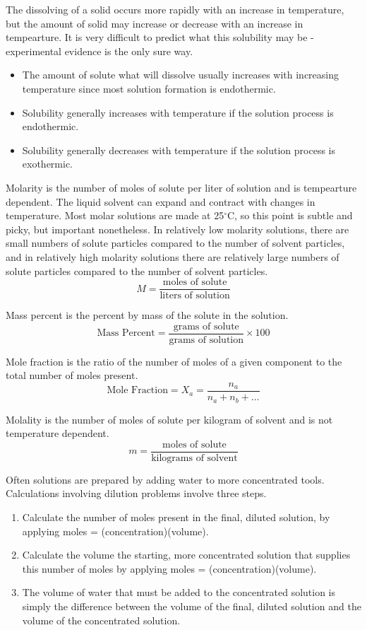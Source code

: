 \documentclass[../chem.tex]{subfiles}
\begin{document}
The dissolving of a solid occurs more rapidly with an increase in temperature, but the amount of solid may increase or decrease with an increase in tempearture.
It is very difficult to predict what this solubility may be - experimental evidence is the only sure way.
\begin{itemize}
    \item The amount of solute what will dissolve usually increases with increasing temperature since most solution formation is endothermic.
    \item Solubility generally increases with temperature if the solution process is endothermic.
    \item Solubility generally decreases with temperature if the solution process is exothermic.
\end{itemize}

Molarity is the number of moles of solute per liter of solution and is tempearture dependent. The liquid solvent can expand and contract with changes in temperature.
Most molar solutions are made at 25$^{\circ}$C, so this point is subtle and picky, but important nonetheless. In relatively low molarity solutions, 
there are small numbers of solute particles compared to the number of solvent particles, and in relatively high molarity solutions there are 
relatively large numbers of solute particles compared to the number of solvent particles.
\[M=\frac{\text{moles of solute}}{\text{liters of solution}}\]

Mass percent is the percent by mass of the solute in the solution.
\[\text{Mass Percent} = \frac{\text{grams of solute}}{\text{grams of solution}}\times 100\]

Mole fraction is the ratio of the number of moles of a given component to the total number of moles present.
\[\text{Mole Fraction}= X_a=\frac{n_a}{n_a+n_b+\dots}\]

Molality is the number of moles of solute per kilogram of solvent and is not temperature dependent. 
\[m=\frac{\text{moles of solute}}{\text{kilograms of solvent}}\]

Often solutions are prepared by adding water to more concentrated tools. Calculations involving dilution problems involve three steps.
\begin{enumerate}
    \item Calculate the number of moles present in the final, diluted solution, by applying moles = (concentration)(volume).
    \item Calculate the volume the starting, more concentrated solution that supplies this number of moles by applying moles = (concentration)(volume).
    \item The volume of water that must be added to the concentrated solution is simply the difference between the volume of the final, diluted solution and the volume of the concentrated solution.
\end{enumerate}
\end{document}
